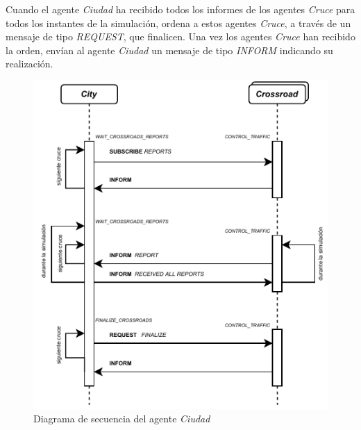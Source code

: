 Cuando el agente \textit{Ciudad} ha recibido todos los informes de los agentes \textit{Cruce} para todos los instantes de la simulación, ordena a estos agentes \textit{Cruce}, a través de un mensaje de tipo \textit{REQUEST}, que finalicen. Una vez los agentes \textit{Cruce} han recibido la orden, envían al agente \textit{Ciudad} un mensaje de tipo \textit{INFORM} indicando su realización.
\begin{figure}[H]
    \centering
    \includegraphics[width=0.85\linewidth]{text/image/DAgen-DS-City.pdf}
    \caption{Diagrama de secuencia del agente \textit{Ciudad}}
    \label{fig:ds_agente_ciudad}
\end{figure}

\newpage
